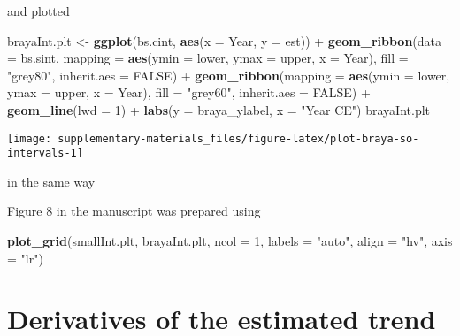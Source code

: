 \documentclass[12pt,]{article}
\newenvironment{Shaded}{\begin{snugshade}}{\end{snugshade}}
\newcommand{\KeywordTok}[1]{\textcolor[rgb]{0.13,0.29,0.53}{\textbf{{#1}}}}
\newcommand{\DataTypeTok}[1]{\textcolor[rgb]{0.13,0.29,0.53}{{#1}}}
\newcommand{\DecValTok}[1]{\textcolor[rgb]{0.00,0.00,0.81}{{#1}}}
\newcommand{\StringTok}[1]{\textcolor[rgb]{0.31,0.60,0.02}{{#1}}}
\newcommand{\OtherTok}[1]{\textcolor[rgb]{0.56,0.35,0.01}{{#1}}}
\newcommand{\NormalTok}[1]{{#1}}
\begin{document}
and plotted

\begin{Shaded}
\begin{Highlighting}[]
\NormalTok{brayaInt.plt <-}\StringTok{ }\KeywordTok{ggplot}\NormalTok{(bs.cint, }\KeywordTok{aes}\NormalTok{(}\DataTypeTok{x =} \NormalTok{Year, }\DataTypeTok{y =} \NormalTok{est)) +}
\StringTok{    }\KeywordTok{geom_ribbon}\NormalTok{(}\DataTypeTok{data =} \NormalTok{bs.sint,}
                \DataTypeTok{mapping =} \KeywordTok{aes}\NormalTok{(}\DataTypeTok{ymin =} \NormalTok{lower, }\DataTypeTok{ymax =} \NormalTok{upper, }\DataTypeTok{x =} \NormalTok{Year),}
                \DataTypeTok{fill =} \StringTok{"grey80"}\NormalTok{, }\DataTypeTok{inherit.aes =} \OtherTok{FALSE}\NormalTok{) +}
\StringTok{    }\KeywordTok{geom_ribbon}\NormalTok{(}\DataTypeTok{mapping =} \KeywordTok{aes}\NormalTok{(}\DataTypeTok{ymin =} \NormalTok{lower, }\DataTypeTok{ymax =} \NormalTok{upper, }\DataTypeTok{x =} \NormalTok{Year),}
                \DataTypeTok{fill =} \StringTok{"grey60"}\NormalTok{, }\DataTypeTok{inherit.aes =} \OtherTok{FALSE}\NormalTok{) +}
\StringTok{    }\KeywordTok{geom_line}\NormalTok{(}\DataTypeTok{lwd =} \DecValTok{1}\NormalTok{) +}
\StringTok{    }\KeywordTok{labs}\NormalTok{(}\DataTypeTok{y =} \NormalTok{braya_ylabel, }\DataTypeTok{x =} \StringTok{"Year CE"}\NormalTok{)}
\NormalTok{brayaInt.plt}
\end{Highlighting}
\end{Shaded}

\begin{center}\texttt{[image: supplementary-materials\_files/figure-latex/plot-braya-so-intervals-1]} \end{center}

in the same way

Figure 8 in the manuscript was prepared using

\begin{Shaded}
\begin{Highlighting}[]
\KeywordTok{plot_grid}\NormalTok{(smallInt.plt, brayaInt.plt, }\DataTypeTok{ncol =} \DecValTok{1}\NormalTok{, }\DataTypeTok{labels =} \StringTok{"auto"}\NormalTok{,}
          \DataTypeTok{align =} \StringTok{"hv"}\NormalTok{, }\DataTypeTok{axis =} \StringTok{"lr"}\NormalTok{)}
\end{Highlighting}
\end{Shaded}

\section{Derivatives of the estimated
trend}\label{derivatives-of-the-estimated-trend}
\end{document}
